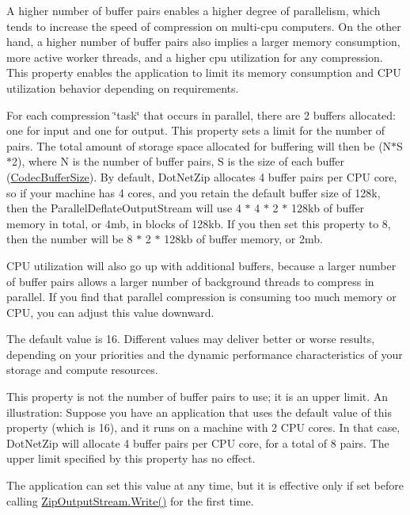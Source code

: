 A higher number of buffer pairs enables a higher degree of parallelism, which tends to increase the speed of compression on multi-\/cpu computers. On the other hand, a higher number of buffer pairs also implies a larger memory consumption, more active worker threads, and a higher cpu utilization for any compression. This property enables the application to limit its memory consumption and C\+PU utilization behavior depending on requirements. 

For each compression \char`\"{}task\char`\"{} that occurs in parallel, there are 2 buffers allocated\+: one for input and one for output. This property sets a limit for the number of pairs. The total amount of storage space allocated for buffering will then be (N$\ast$\+S$\ast$2), where N is the number of buffer pairs, S is the size of each buffer (\mbox{\hyperlink{class_super_tiled2_unity_1_1_ionic_1_1_zip_1_1_zip_output_stream_af75e64bdb4e118bc11e39cab569386c5}{Codec\+Buffer\+Size}}). By default, Dot\+Net\+Zip allocates 4 buffer pairs per C\+PU core, so if your machine has 4 cores, and you retain the default buffer size of 128k, then the Parallel\+Deflate\+Output\+Stream will use 4 $\ast$ 4 $\ast$ 2 $\ast$ 128kb of buffer memory in total, or 4mb, in blocks of 128kb. If you then set this property to 8, then the number will be 8 $\ast$ 2 $\ast$ 128kb of buffer memory, or 2mb. 

C\+PU utilization will also go up with additional buffers, because a larger number of buffer pairs allows a larger number of background threads to compress in parallel. If you find that parallel compression is consuming too much memory or C\+PU, you can adjust this value downward. 

The default value is 16. Different values may deliver better or worse results, depending on your priorities and the dynamic performance characteristics of your storage and compute resources. 

This property is not the number of buffer pairs to use; it is an upper limit. An illustration\+: Suppose you have an application that uses the default value of this property (which is 16), and it runs on a machine with 2 C\+PU cores. In that case, Dot\+Net\+Zip will allocate 4 buffer pairs per C\+PU core, for a total of 8 pairs. The upper limit specified by this property has no effect. 

The application can set this value at any time, but it is effective only if set before calling {\ttfamily \mbox{\hyperlink{class_super_tiled2_unity_1_1_ionic_1_1_zip_1_1_zip_output_stream_a8cd95df92691b8f266216f1d6984dfec}{Zip\+Output\+Stream.\+Write()}}} for the first time. 

